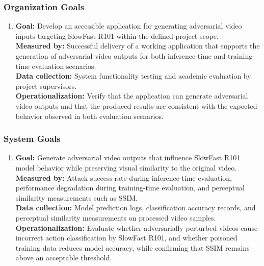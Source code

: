 \subsubsection{Organization Goals}
\begin{enumerate}
    \item 
    \textbf{Goal:}
    Develop an accessible application for generating adversarial video inputs targeting SlowFast R101 within the defined project scope. \\
    \textbf{Measured by:} 
    Successful delivery of a working application that supports the generation of adversarial video outputs for both inference-time and training-time evaluation scenarios. \\
    \textbf{Data collection:}
    System functionality testing and academic evaluation by project supervisors. \\
    \textbf{Operationalization:} 
    Verify that the application can generate adversarial video outputs and that the produced results are consistent with the expected behavior observed in both evaluation scenarios.
\end{enumerate}

\subsubsection{System Goals}
\begin{enumerate}
    \item 
    \textbf{Goal:}
    Generate adversarial video outputs that influence SlowFast R101 model behavior while preserving visual similarity to the original video. \\
    \textbf{Measured by:} 
    Attack success rate during inference-time evaluation, performance degradation during training-time evaluation, and perceptual similarity measurements such as SSIM. \\
    \textbf{Data collection:}
    Model prediction logs, classification accuracy records, and perceptual similarity measurements on processed video samples. \\
    \textbf{Operationalization:} 
    Evaluate whether adversarially perturbed videos cause incorrect action classification by SlowFast R101, and whether poisoned training data reduces model accuracy, while confirming that SSIM remains above an acceptable threshold.
\end{enumerate}


